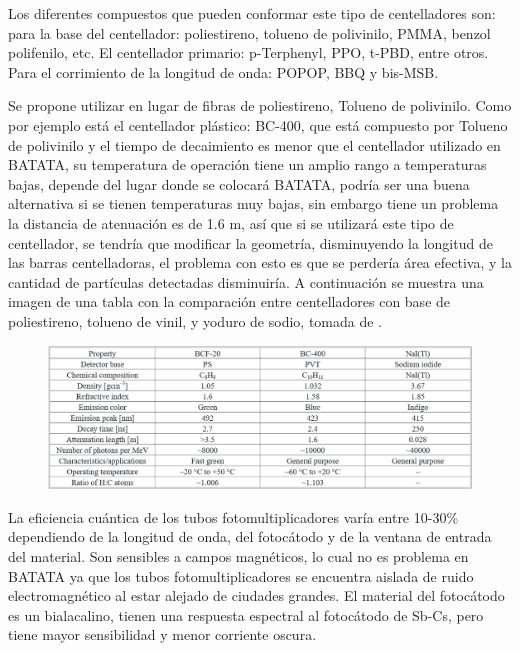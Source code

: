 \documentclass[a4paper,10pt]{article}
\numberwithin{equation}{section}
\begin{document}
Los diferentes compuestos que pueden conformar este tipo de centelladores son: 
para la base del centellador: poliestireno,  tolueno de polivinilo, PMMA, benzol 
polifenilo, etc. El centellador primario: p-Terphenyl, PPO, t-PBD, entre otros. 
Para el corrimiento de la longitud de onda: POPOP, BBQ y bis-MSB. 

\vspace{.3cm}

Se propone utilizar en lugar de fibras de poliestireno, Tolueno de polivinilo. Como
por ejemplo está el centellador plástico: BC-400, que está compuesto por Tolueno de 
polivinilo y el tiempo de decaimiento es menor que el centellador utilizado en 
BATATA, su temperatura de operación tiene un amplio rango a temperaturas bajas, 
depende del lugar donde se colocará BATATA, podría ser una buena alternativa si 
se tienen temperaturas muy bajas, sin embargo tiene un problema la distancia de 
atenuación es de 1.6 m, así que si se utilizará este tipo de centellador, se 
tendría que modificar la geometría, disminuyendo la longitud de las barras 
centelladoras, el problema con esto es que se perdería área efectiva, y la cantidad
de partículas detectadas disminuiría. A continuación se muestra una imagen de una 
tabla con la comparación entre centelladores con base de poliestireno, tolueno de vinil, y 
yoduro de sodio, tomada de \cite{mirza}.

\begin{figure}[H]
 \center
 \includegraphics[scale=0.4]{fig8}
\end{figure}

La eficiencia cuántica de los tubos fotomultiplicadores varía entre 10-30\% dependiendo de la longitud 
de onda, del fotocátodo y de la ventana de entrada del material. Son sensibles a
campos magnéticos, lo cual no es problema en BATATA ya que los tubos fotomultiplicadores se encuentra
aislada de ruido electromagnético al estar alejado de ciudades grandes. El material 
del fotocátodo es un bialacalino, tienen una respuesta espectral al 
fotocátodo de Sb-Cs, pero tiene mayor sensibilidad y menor corriente oscura.
\end{document}
